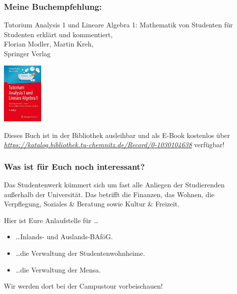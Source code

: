 \documentclass[10pt]{beamer}
\makeatletter
\newcommand{\highl}[1]{\color{tuccolor@ma}#1\color{black}}
\makeatother
\begin{document}
\begin{frame}
	\frametitle{Meine Buchempfehlung:}

	Tutorium Analysis 1 und Lineare Algebra 1: Mathematik von Studenten für Studenten erklärt und kommentiert, \\
	Florian Modler, Martin Kreh, \\
	Springer Verlag 

	\begin{center}
		\includegraphics[width=2cm]{bilder/Buch.jpg}
	\end{center}

	Dieses Buch ist in der Bibliothek ausleihbar und als E-Book kostenlos über \highl{\textit{\href{https://katalog.bibliothek.tu-chemnitz.de/Record/0-1030104638}{https://katalog.bibliothek.tu-chemnitz.de/Record/0-1030104638}}} verfügbar!
\end{frame}

\begin{frame}
	\frametitle{Was ist für Euch noch interessant?}

	\begin{block}{\vphantom{X}}
		Das Studentenwerk kümmert sich um fast alle Anliegen der Studierenden außerhalb der Universität. Das betrifft die Finanzen, das Wohnen, die Verpflegung, Soziales \& Beratung sowie Kultur \& Freizeit.
	\end{block}

	Hier ist Eure Anlaufstelle für \ldots

	\begin{itemize}
		\item \ldots Inlands- und Auslands-BAföG.
		\item \ldots die Verwaltung der Studentenwohnheime.
		\item \ldots die Verwaltung der Mensa.
	\end{itemize}

	\vspace{1cm}

	Wir werden dort bei der Campustour vorbeischauen! 
\end{frame}
\end{document}
